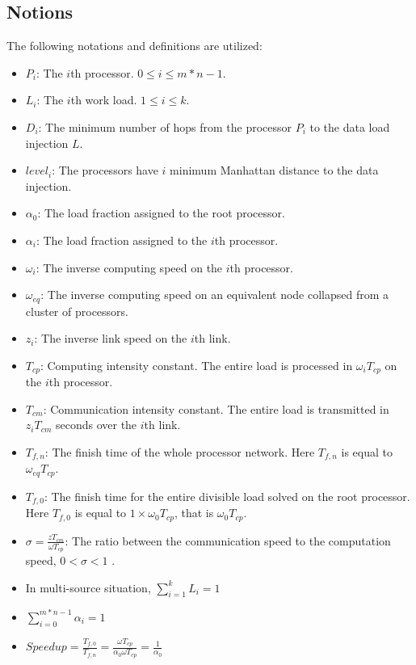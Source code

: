 \subsection{Notions}
The following notations and definitions are utilized:
\begin{itemize}
\item $P_{i}$: The $i$th processor.   $0  \leq i \leq m*n-1$.  
\item $L_{i}$: The $i$th work load.   $1 \leq i \leq k$.  
\item $D_{i}$: The minimum number of hops from the processor $P_{i}$ to the data load injection $L$.  
\item $level_{i}$: The processors have $i$ minimum Manhattan distance to the data injection.
\item $\alpha_{0}$: The load fraction assigned to the root processor.  
\item $\alpha_{i}$: The load fraction assigned to the $i$th processor.  
\item $\omega_{i}$: The inverse computing speed on the $i$th processor.  
\item $\omega_{eq}$: The inverse computing speed on an equivalent node collapsed from a cluster of processors.  

\item $z_{i}$: The inverse link speed on the $i$th link.  
\item $T_{cp}$: Computing intensity constant.  The entire load is processed in $\omega_{i}T_{cp}$ on the $i$th processor.  

\item $T_{cm}$: Communication intensity constant.  The entire load is transmitted in $z_{i}T_{cm}$ seconds over the $i$th link.  
\item $T_{f, n}$: The finish time of the whole processor network.  Here $T_{f, n}$ is equal to $\omega_{eq}T_{cp}$.  

\item $T_{f, 0}$: The finish time for the entire divisible load solved on the root processor.  Here $T_{f, 0}$ is equal to $1 \times \omega_{0}T_{cp}$,  that is $\omega_{0}T_{cp}$.  

\item $\sigma = \frac{zT_{cm}}{\omega T_{cp}}$: The ratio between the communication speed to the computation speed,  $0 < \sigma < 1$ \cite{bharadwaj1996scheduling} \cite{hung2004switching}.  

\item In multi-source situation, $\sum_{i = 1}^{k} L_{i} = 1$
\item $\sum_{i = 0}^{m*n-1} \alpha_{i}= 1$
\item $Speedup = \frac{T_{f, 0}}{T_{f, n}}= \frac{\omega T_{cp}}{\alpha_{0}\omega T_{cp}} = \frac{1}{\alpha_{0}}$
\end{itemize}
\newpage